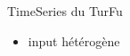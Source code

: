 \begin{frame}{TimeSeries du TurFu}
    \begin{itemize}
    \item input hétérogène
    \end{itemize}
\end{frame}